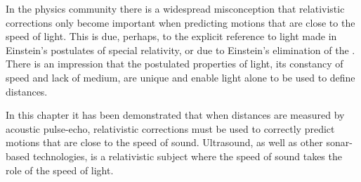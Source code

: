 In the physics community there is a widespread misconception that
relativistic corrections only become important  when predicting  motions that are close to the speed of light.
This is  due, perhaps, to the explicit reference to light made in Einstein's postulates of special relativity,
or due to Einstein's elimination of the \aether.
There is an impression that the postulated properties of light, its  constancy of speed and lack of medium,
are unique
and 
enable light alone to be used to define  distances.




In this chapter it has been demonstrated that
 when distances are measured by acoustic pulse-echo, %
 relativistic corrections must be used to correctly predict motions that  are close to the speed of sound.
Ultrasound, as well as other sonar-based technologies, is  a relativistic subject
where  the  speed of sound takes the role of the speed of light.


